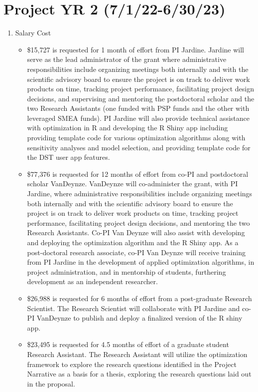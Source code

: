 \section*{Project YR 2 (7/1/22-6/30/23)}
\begin{enumerate}
\item Salary Cost
\begin{itemize}
\item  \$15,727 is requested for 1 month of effort from PI Jardine. Jardine will serve as the lead administrator of the grant where administrative responsibilities include organizing meetings both internally and with the scientific advisory board to ensure the project is on track to deliver work products on time, tracking project performance, facilitating project design decisions, and supervising and mentoring the postdoctoral scholar and the two Research Assistants (one funded with PSP funds and the other with leveraged SMEA funds). PI Jardine will also provide technical assistance with optimization in R and developing the R Shiny app including providing template code for various optimization algorithms along with sensitivity analyses and model selection, and providing template code for the DST user app features.
\item \$77,376 is requested for 12 months of effort from co-PI and postdoctoral scholar VanDeynze. VanDeynze will co-administer the grant, with PI Jardine, where administrative responsibilities include organizing meetings both internally and with the scientific advisory board to ensure the project is on track to deliver work products on time, tracking project performance, facilitating project design decisions, and mentoring the two Research Assistants. Co-PI Van Deynze will also assist with developing and deploying the optimization algorithm and the R Shiny app. As a post-doctoral research associate, co-PI Van Deynze will receive training from PI Jardine in the development of applied optimization algorithms, in project administration, and in mentorship of students, furthering development as an independent researcher. 
\item \$26,988 is requested for 6 months of effort from a post-graduate Research Scientist. The Research Scientist will collaborate with PI Jardine and co-PI VanDeynze to publish and deploy a finalized version of the R shiny app.
\item \$23,495 is requested for 4.5 months of effort of a graduate student Research Assistant. The Research Assistant will utilize the optimization framework to explore the research questions identified in the Project Narrative as a basis for a thesis, exploring the research questions laid out in the proposal.

\end{itemize}
\end{enumerate}

